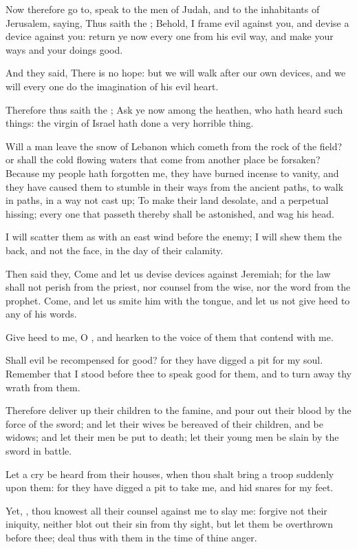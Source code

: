 \Verse Now therefore go to, speak to the men of Judah, and to the inhabitants of Jerusalem, saying, Thus saith the \LORD; Behold, I frame evil against you, and devise a device against you: return ye now every one from his evil way, and make your ways and your doings good.

\Verse And they said, There is no hope: but we will walk after our own devices, and we will every one do the imagination of his evil heart.

\Verse Therefore thus saith the \LORD; Ask ye now among the heathen, who hath heard such things: the virgin of Israel hath done a very horrible thing.

\Verse Will a man leave the snow of Lebanon which cometh from the rock of the field? or shall the cold flowing waters that come from another place be forsaken?  \Verse Because my people hath forgotten me, they have burned incense to vanity, and they have caused them to stumble in their ways from the ancient paths, to walk in paths, in a way not cast up; \Verse To make their land desolate, and a perpetual hissing; every one that passeth thereby shall be astonished, and wag his head.

\Verse I will scatter them as with an east wind before the enemy; I will shew them the back, and not the face, in the day of their calamity.

\Verse Then said they, Come and let us devise devices against Jeremiah; for the law shall not perish from the priest, nor counsel from the wise, nor the word from the prophet. Come, and let us smite him with the tongue, and let us not give heed to any of his words.

\Verse Give heed to me, O \LORD, and hearken to the voice of them that contend with me.

\Verse Shall evil be recompensed for good? for they have digged a pit for my soul. Remember that I stood before thee to speak good for them, and to turn away thy wrath from them.

\Verse Therefore deliver up their children to the famine, and pour out their blood by the force of the sword; and let their wives be bereaved of their children, and be widows; and let their men be put to death; let their young men be slain by the sword in battle.

\Verse Let a cry be heard from their houses, when thou shalt bring a troop suddenly upon them: for they have digged a pit to take me, and hid snares for my feet.

\Verse Yet, \LORD, thou knowest all their counsel against me to slay me: forgive not their iniquity, neither blot out their sin from thy sight, but let them be overthrown before thee; deal thus with them in the time of thine anger.


